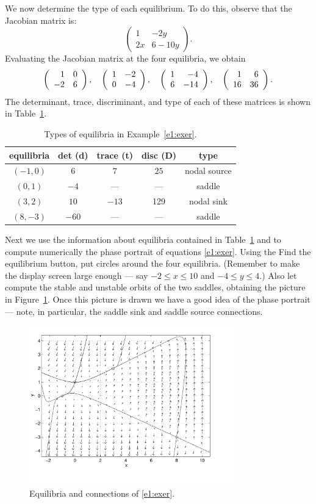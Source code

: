 \documentclass{ximera}
\begin{document}
We now determine the type of each equilibrium.  To do this,
observe that the Jacobian matrix 
is:
\[
\left(\begin{array}{cc} 1 & -2y \\ 2x & 6-10y
\end{array}\right). 
\]
Evaluating the Jacobian matrix at the four equilibria, we obtain
\[
\left(\begin{array}{rr} 1 & 0\\ -2 &6\end{array}\right), \quad \left(\begin{array}{rr} 1 & -2\\ 0 &-4\end{array}\right), \quad
\left(\begin{array}{rr} 1 & -4\\ 6 &-14\end{array}\right), \quad \left(\begin{array}{rr} 1 & 6\\ 16 &36\end{array}\right).
\]
The determinant, trace, 
discriminant, and type of each of these
matrices is shown in Table~\ref{t:exertype}.
\begin{table}[htb]
\begin{center}
\begin{tabular}{|c|c|c|c|c|}
\hline
equilibria & det (d) & trace (t) & disc (D) & type \\
\hline
$(-1,0)$ & $6$ & $7$ & $25$ & nodal source \\
\hline
$(0,1)$ & $-4$ & --- & --- & saddle \\
\hline
$(3,2)$ & $10$ & $-13$ & 129 & nodal sink \\
\hline
$(8,-3)$ & $-60$ & --- & --- & saddle\\
\hline
\end{tabular}
\caption{Types of equilibria in Example~\protect\eqref{e1:exer}.}
\label{t:exertype}
\end{center}
\end{table}

Next we use the information about equilibria contained in 
Table~\ref{t:exertype} and {\pplane}
 to compute numerically the 
phase portrait of equations \eqref{e1:exer}.  Using 
the {\sf Find the equilibrium} button, put circles around
the four equilibria.  (Remember to make the display screen large
enough --- say $-2\leq x \leq 10$ and $-4\leq y \leq 4$.) Also
let {\pplane} compute the stable and unstable orbits of
the two saddles, obtaining the picture in Figure~\ref{F:ex12}.
Once this picture is drawn we have a good idea of the phase
portrait --- note, in particular, the saddle sink and saddle
source connections.


\begin{figure}[htb]
           \centerline{%
           \includegraphics[width=3.5in]{../figures/ex12exam.pdf}}
		\caption{Equilibria and connections of \protect\eqref{e1:exer}.} 
           \label{F:ex12}
\end{figure}
\end{document}
